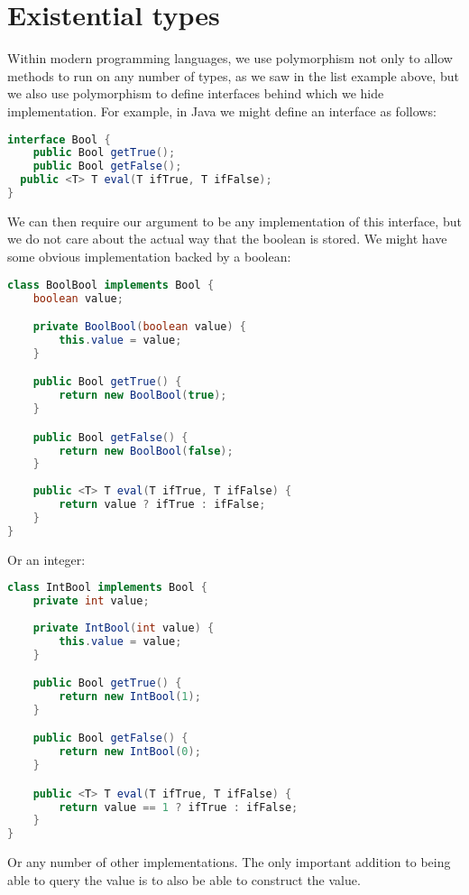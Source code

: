 \documentclass{article}
\begin{document}
\newpage
\section{Existential types}

Within modern programming languages, we use polymorphism not only to allow methods to run on any number of types, as we saw in the list example above, but we also use polymorphism to define interfaces behind which we hide implementation. For example, in Java we might define an interface as follows:

\begin{lstlisting}[language=Java]
interface Bool {
	public Bool getTrue();
	public Bool getFalse();
  public <T> T eval(T ifTrue, T ifFalse);
}
\end{lstlisting}

We can then require our argument to be any implementation of this interface, but we do not care about the actual way that the boolean is stored. We might have some obvious implementation backed by a boolean:

\begin{lstlisting}[language=Java]
class BoolBool implements Bool {
	boolean value;

	private BoolBool(boolean value) {
		this.value = value;
	}

	public Bool getTrue() {
		return new BoolBool(true);
	}

	public Bool getFalse() {
		return new BoolBool(false);
	}
	
	public <T> T eval(T ifTrue, T ifFalse) {
		return value ? ifTrue : ifFalse;
	}
}
\end{lstlisting}

\newpage
Or an integer:

\begin{lstlisting}[language=Java]
class IntBool implements Bool {
	private int value;
	
	private IntBool(int value) {
		this.value = value;
	}

	public Bool getTrue() {
		return new IntBool(1);
	}

	public Bool getFalse() {
		return new IntBool(0);
	}

	public <T> T eval(T ifTrue, T ifFalse) {
		return value == 1 ? ifTrue : ifFalse;
	}
}
\end{lstlisting}

Or any number of other implementations. The only important addition to being able to query the value is to also be able to construct the value.
\end{document}

